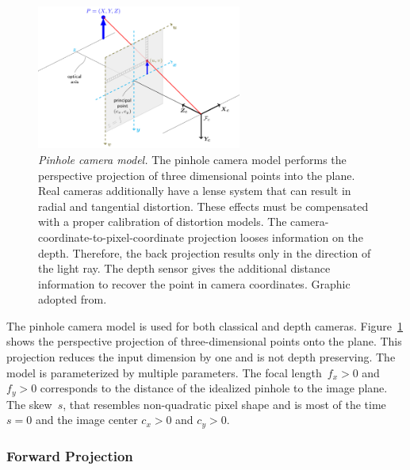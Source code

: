 \begin{figure}[b!]
    \includegraphics[width=0.6\textwidth]{chapter03/img/pinhole_camera_model.png}
    \caption[Pinhole camera model]{\emph{Pinhole camera model.} The pinhole camera model performs the perspective projection of three dimensional points into the plane. Real cameras additionally have a lense system that can result in radial and tangential distortion. These effects must be compensated with a proper calibration of distortion models. The camera-coordinate-to-pixel-coordinate projection looses information on the depth. Therefore, the back projection results only in the direction of the light ray. The depth sensor gives the additional distance information to recover the point in camera coordinates. Graphic adopted from\cite{opencv_pinhole}.}\label{fig:pinhole_model}
\end{figure}
The pinhole camera model is used for both classical and depth cameras.
Figure~\ref{fig:pinhole_model} shows the perspective projection of three-dimensional points onto the plane\cite[p. 25-35]{hartley_2004}.
This projection reduces the input dimension by one and is not depth preserving.
The model is parameterized by multiple parameters.
The focal length~$f_x > 0$ and $f_y > 0$ corresponds to the distance of the idealized pinhole to the image plane.
The skew~$s$, that resembles non-quadratic pixel shape and is most of the time $s = 0$ and the image center $c_x > 0$ and $c_y > 0$.

\subsubsection*{Forward Projection}

